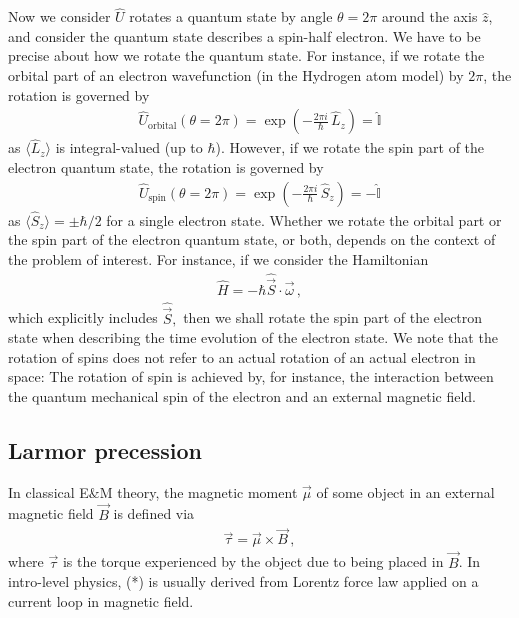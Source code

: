 \documentclass[11pt, onesided]{book}
\theoremstyle{break}
\theoremstyle{break}
\begin{document}
Now we consider $\hat{U}$ rotates a quantum state by angle $\theta = 2\pi$ around the axis $\hat{z}$, and consider the quantum state describes a spin-half electron. We have to be precise about how we rotate the quantum state. For instance, if we rotate the orbital part of an electron wavefunction (in the Hydrogen atom model) by $2\pi$, the rotation is governed by 
\begin{align*}
\hat{U}_{\text{orbital}}(\theta=2\pi) = \exp\left( - \frac{2\pi i}{\hbar}\,  \hat{L}_z\right) = \hat{\mathbb{I}}
\end{align*}
as $\langle \hat{L}_z\rangle $ is integral-valued (up to $\hbar$). However, if we rotate the spin part of the electron quantum state, the rotation is governed by 
\begin{align*}
\hat{U}_{\text{spin}}(\theta=2\pi) = \exp\left( - \frac{2\pi i}{\hbar}\,  \hat{S}_z\right) =- \hat{\mathbb{I}}
\end{align*}
as $\langle \hat{S}_z\rangle = \pm \hbar/2$ for a single electron state. Whether we rotate the orbital part or the spin part of the electron quantum state, or both, depends on the context of the problem of interest. For instance, if we consider the Hamiltonian 
\begin{align*}
\hat{H} = -\hbar \hat{\vec{S}}\cdot \vec{\omega}\,,
\end{align*}
which explicitly includes $\hat{\vec{S}}, $ then we shall rotate the spin part of the electron state when describing the time evolution of the electron state. We note that the rotation of spins does not refer to an actual rotation of an actual electron in space: The rotation of spin is achieved by, for instance, the interaction between the quantum mechanical spin of the electron and an external magnetic field.


\subsection{Larmor precession}
In classical E$\&$M theory, the magnetic moment $\vec{\mu}$ of some object in an external magnetic field $\vec{B}$ is defined via
\begin{align*}
\vec{\tau} = \vec{\mu} \times \vec{B}\,,\tag{*}
\end{align*}
where $\vec{\tau}$ is the torque experienced by the object due to being placed in $\vec{B}$. In intro-level physics, (*) is usually derived from Lorentz force law applied on a current loop in magnetic field. \\
\end{document}
